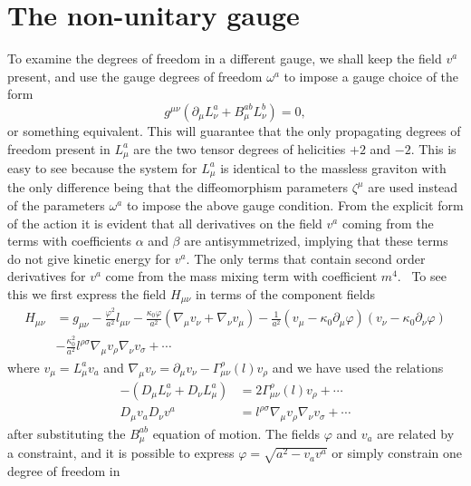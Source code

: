 \documentclass[a4paper,12pt]{article}
\begin{document}
\section{The non-unitary gauge}

To examine the degrees of freedom in a different gauge, we shall keep the
field $v^{a}$ present, and use the gauge degrees of freedom $\omega^{a}$ to
impose a gauge choice of the form
\[
g^{\mu\nu}\left(  \partial_{\mu}L_{\nu}^{a}+B_{\mu}^{ab}L_{\nu}^{b}\right)
=0,
\]
or something equivalent. This will guarantee that the only propagating degrees
of freedom present in $L_{\mu}^{a}$ are the two tensor degrees of helicities
$+2$ and $-2$. This is easy to see because the system for $L_{\mu}^{a}$ is
identical to the massless graviton with the only difference being that the
diffeomorphism parameters $\zeta^{\mu}$ are used instead of the parameters
$\omega^{a}$ to impose the above gauge condition. From the explicit form of
the action it is evident that all derivatives on the field $v^{a}$ coming from
the terms with coefficients $\alpha$ and $\beta$ are antisymmetrized, implying
that these terms do not give kinetic energy for $v^{a}.$ The only terms that
contain second order derivatives for $v^{a}$ come from the mass mixing term
with coefficient $m^{4}$. \ To see this we first express the field $H_{\mu\nu
}$ in terms of the component fields%
\begin{align*}
H_{\mu\nu} &  =g_{\mu\nu}-\frac{\varphi^{2}}{a^{2}}l_{\mu\nu}-\frac{\kappa
_{0}\varphi}{a^{2}}\left(  \nabla_{\mu}v_{\nu}+\nabla_{\nu}v_{\mu}\right)
-\frac{1}{a^{2}}\left(  v_{\mu}-\kappa_{0}\partial_{\mu}\varphi\right)
\left(  v_{\nu}-\kappa_{0}\partial_{\nu}\varphi\right)  \\
&  -\frac{\kappa_{0}^{2}}{a^{2}}l^{\rho\sigma}\nabla_{\mu}v_{\rho}\nabla_{\nu
}v_{\sigma}+\cdots
\end{align*}
where $v_{\mu}=L_{\mu}^{a}v_{a}$ and $\nabla_{\mu}v_{\nu}=\partial_{\mu}%
v_{\nu}-\Gamma_{\mu\nu}^{\rho}\left(  l\right)  v_{\rho}$ and we have used the
relations
\begin{align*}
-\left(  D_{\mu}L_{\nu}^{a}+D_{\nu}L_{\mu}^{a}\right)   &  =2\Gamma_{\mu\nu
}^{\rho}\left(  l\right)  v_{\rho}+\cdots\\
D_{\mu}v_{a}D_{\nu}v^{a} &  =l^{\rho\sigma}\nabla_{\mu}v_{\rho}\nabla_{\nu
}v_{\sigma}+\cdots
\end{align*}
after substituting the $B_{\mu}^{ab}$ equation of motion. The fields $\varphi$
and $v_{a}$ are related by a constraint, and it is possible to express
$\varphi=\sqrt{a^{2}-v_{a}v^{a}}$ or simply constrain one degree of freedom in
\end{document}
